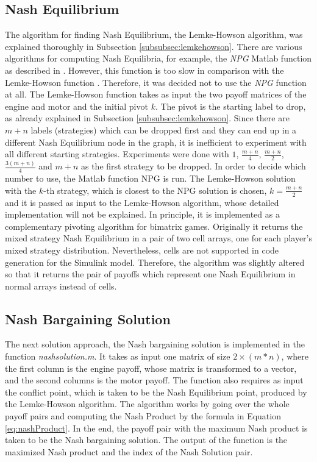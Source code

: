 \subsection{Nash Equilibrium}
The algorithm for finding Nash Equilibrium, the Lemke-Howson algorithm, was explained thoroughly in Subsection \ref{subsubsec:lemkehowson}. There are various algorithms for computing Nash Equilibria, for example, the \textit{NPG} Matlab function as described in \citet{npg}. However, this function is too slow in comparison with the Lemke-Howson function \citep{lemkeHowson2014Matlab}. Therefore, it was decided not to use the \textit{NPG} function at all. The Lemke-Howson function takes as input the two payoff matrices of the engine and motor and the initial pivot $k$. The pivot is the starting label to drop, as already explained in Subsection \ref{subsubsec:lemkehowson}. Since there are $m+n$ labels (strategies) which can be dropped first and they can end up in a different Nash Equilibrium node in the graph, it is inefficient to experiment with all different starting strategies. Experiments were done with $1$, $\frac{m+n}{4}$, $\frac{m+n}{2}$, $\frac{3(m+n)}{4}$ and $m+n$ as the first strategy to be dropped. In order to decide which number to use, the Matlab function NPG is run. The Lemke-Howson solution with the $k$-th strategy, which is closest to the NPG solution is chosen, $k = \frac{m+n}{2}$ and it is passed as input to the Lemke-Howson algorithm, whose detailed implementation will not be explained. In principle, it is implemented as a complementary pivoting algorithm for bimatrix games. Originally it returns the mixed strategy Nash Equilibrium in a pair of two cell arrays, one for each player's mixed strategy distribution. Nevertheless, cells are not supported in code generation for the Simulink model. Therefore, the algorithm was slightly altered so that it returns the pair of payoffs which represent one Nash Equilibrium in normal arrays instead of cells.

\subsection{Nash Bargaining Solution}
The next solution approach, the Nash bargaining solution is implemented in the function \textit{nashsolution.m}. It takes as input one matrix of size $2 \times (m*n)$, where the first column is the engine payoff, whose matrix is transformed to a vector, and the second columns is the motor payoff. The function also requires as input the conflict point, which is taken to be the Nash Equilibrium point, produced by the Lemke-Howson algorithm. The algorithm works by going over the whole payoff pairs and computing the Nash Product by the formula in Equation \ref{eq:nashProduct}. In the end, the payoff pair with the maximum Nash product is taken to be the Nash bargaining solution. The output of the function is the maximized Nash product and the index of the Nash Solution pair.

